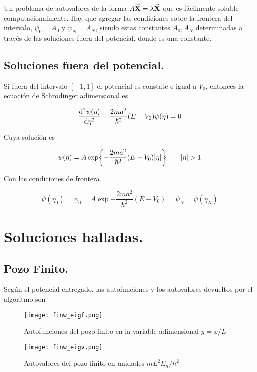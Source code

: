 \documentclass{article}
\begin{document}
Un problema de autovalores de la forma $A\va{X}=\lambda\va{X}$ que es fácilmente soluble computacionalmente. Hay que agregar las condiciones sobre la frontera del intervalo, $\psi_0=A_0$ y $\psi_N=A_N$, siendo estas constantes $A_0, A_N$ determinadas a través de las soluciones fuera del potencial, donde es una constante.

\subsection{Soluciones fuera del potencial.}

Si fuera del intervalo $[-1,1]$ el potencial es constate e igual a $V_0$, entonces la ecuación de Schrödinger adimensional es

\begin{equation*}
    \dv[2]{\psi(\eta)}{\eta}+\frac{2 m a^2}{\hbar^2}(E-V_0)\psi(\eta)=0
\end{equation*}

Cuya solución es

\begin{equation}
    \psi(\eta)=A\exp{-\frac{2ma^2}{\hbar^2}(E-V_0)\abs{\eta}} \qquad \abs{\eta}>1
\end{equation}

Con las condiciones de frontera

\begin{equation*}
    \psi(\eta_0)=\psi_0=A\exp{-\frac{2ma^2}{\hbar^2}(E-V_0)}=\psi_N=\psi(\eta_N)
\end{equation*}

\section{Soluciones halladas.}

\subsection{Pozo Finito.}

Según el potencial entregado, las autofunciones y los autovalores devueltos por el algoritmo son

\begin{figure}[htp]
    \centering
    \texttt{[image: finw\_eigf.png]}
    \caption{Autofunciones del pozo finito en la variable adimensional $y=x/L$}
    \label{fig:my_label}
\end{figure}

\begin{figure}[htp]
    \centering
    \texttt{[image: finw\_eigv.png]}
    \caption{Autovalores del pozo finito en unidades $mL^2E_n/\hbar^2$}
    \label{fig:my_label}
\end{figure}
\end{document}
